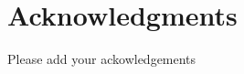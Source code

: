 \documentclass[authoryear]{elsarticle}
\begin{document}
\section{Acknowledgments}
{\color{red}Please add your ackowledgements}

%
%
%
%
\end{document}

